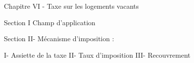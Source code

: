 Chapitre VI - Taxe sur les logements vacants

	Section I Champ d'application

	Section II- Mécanisme d’imposition :

		I- Assiette de la taxe
		II- Taux d'imposition
		III- Recouvrement
